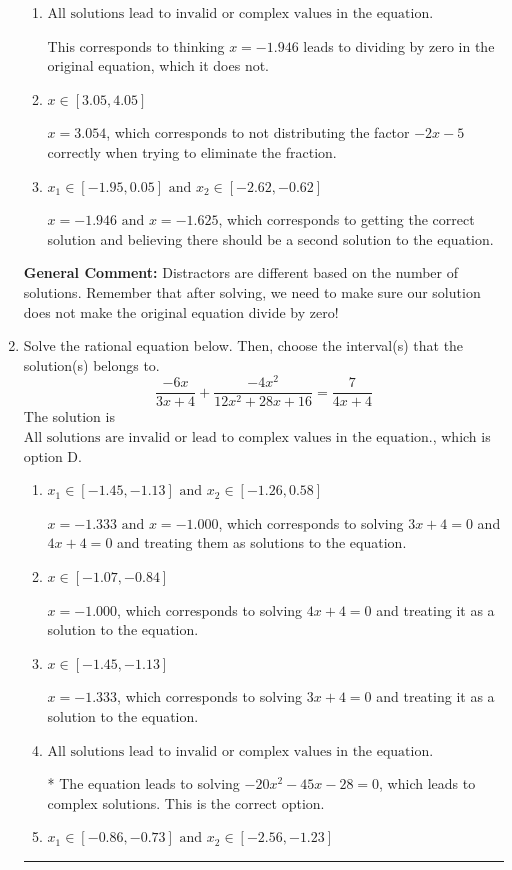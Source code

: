\documentclass{extbook}[14pt]
\newcommand{\litem}[1]{\item #1

\rule{\textwidth}{0.4pt}}
\begin{document}
\begin{enumerate}
{\begin{enumerate}[label=\Alph*.]
$x = -1.946 \text{ and } x = 3.054$, which corresponds to getting the correct solution and believing there should be a second solution to the equation.
\item \( \text{All solutions lead to invalid or complex values in the equation.} \)

This corresponds to thinking $x = -1.946$ leads to dividing by zero in the original equation, which it does not.
\item \( x \in [3.05,4.05] \)

$x = 3.054$, which corresponds to not distributing the factor $-2x -5$ correctly when trying to eliminate the fraction.
\item \( x_1 \in [-1.95, 0.05] \text{ and } x_2 \in [-2.62,-0.62] \)

$x = -1.946 \text{ and } x = -1.625$, which corresponds to getting the correct solution and believing there should be a second solution to the equation.
\end{enumerate}

\textbf{General Comment:} Distractors are different based on the number of solutions. Remember that after solving, we need to make sure our solution does not make the original equation divide by zero!
}
\litem{
Solve the rational equation below. Then, choose the interval(s) that the solution(s) belongs to.
\[ \frac{-6x}{3x + 4} + \frac{-4x^{2}}{12x^{2} +28 x + 16} = \frac{7}{4x + 4} \]The solution is \( \text{All solutions are invalid or lead to complex values in the equation.} \), which is option D.\begin{enumerate}[label=\Alph*.]
\item \( x_1 \in [-1.45, -1.13] \text{ and } x_2 \in [-1.26,0.58] \)

$x = -1.333 \text{ and } x = -1.000$, which corresponds to solving $3x + 4 = 0$ and $4x + 4 = 0$ and treating them as solutions to the equation.
\item \( x \in [-1.07,-0.84] \)

$x = -1.000$, which corresponds to solving $4x + 4 = 0$ and treating it as a solution to the equation.
\item \( x \in [-1.45,-1.13] \)

$x = -1.333$, which corresponds to solving $3x + 4 = 0$ and treating it as a solution to the equation.
\item \( \text{All solutions lead to invalid or complex values in the equation.} \)

* The equation leads to solving $-20x^{2} -45 x -28=0$, which leads to complex solutions. This is the correct option.
\item \( x_1 \in [-0.86, -0.73] \text{ and } x_2 \in [-2.56,-1.23] \)


\end{enumerate}}
\end{enumerate}
\end{document}
